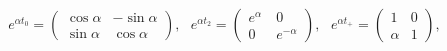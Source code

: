 \begin{equation}\label{H}
 e^{\alpha t_0}=\left( \begin{array}{cr}
  \cos\alpha&-\sin\alpha\\\sin\alpha&\cos\alpha \end{array}\right),
~~~e^{\alpha t_2}  =\left( \begin{array}{cr}
  e^\alpha&~0~~\\0&~e^{-\alpha} \end{array}\right),~~~
e^{\alpha t_+} =\left( \begin{array}{cr}
  1&0\\\alpha&1 \end{array}\right),
\end{equation}

